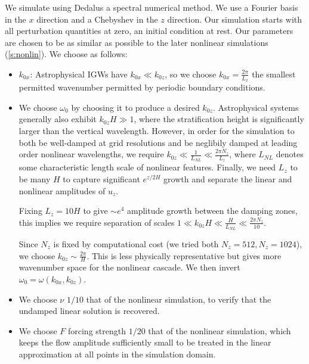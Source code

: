 \documentclass[twocolumn,
        nofootinbib, %
        usenames, %
        aps,
        prd,
        dvipsnames %
    ]{revtex4-1}%
\begin{document}
We simulate using Dedalus\cite{dedalus} a spectral numerical method. We use a
Fourier basis in the $x$ direction and a Chebyshev in the $z$ direction. Our
simulation starts with all perturbation quantities at zero, an initial condition
at rest. Our parameters are chosen to be as similar as possible to the later
nonlinear simulations (\autoref{s:nonlin}). We choose as follows:
\begin{itemize}
    \item $k_{0x}$: Astrophysical IGWs have $k_{0x} \ll k_{0z}$, so we choose $k_{0x}
        = \frac{2\pi}{L_x}$ the smallest permitted wavenumber permitted by
        periodic boundary conditions.

    \item We choose $\omega_0$ by choosing it to produce a desired $k_{0z}$.
        Astrophysical systems generally also exhibit $k_{0z}H \gg 1$, where the
        stratification height is significantly larger than the vertical
        wavelength. However, in order for the simulation to both be well-damped
        at grid resolutions and be neglibily damped at leading order nonlinear
        wavelengths, we require $k_{0z} \ll \frac{1}{L_{NL}} \ll \frac{2\pi
        N_z}{L_z}$, where $L_{NL}$ denotes some characteristic length scale of
        nonlinear features. Finally, we need $L_z$ to be many $H$ to capture
        significant $e^{z/2H}$ growth and separate the linear and nonlinear
        amplitudes of $u_z$.

        Fixing $L_z = 10H$ to give $\sim e^4$ amplitude growth between the
        damping zones, this implies we require separation of scales $1 \ll
        k_{0z}H \ll \frac{H}{L_{NL}} \ll \frac{2\pi N_z}{10}$.

        Since $N_z$ is fixed by computational cost (we tried both $N_z = 512,
        N_z = 1024$), we choose $k_{0z} \sim \frac{2\pi}{H}$. This is less
        physically representative but gives more wavenumber space for the
        nonlinear cascade. We then invert $\omega_0 = \omega(k_{0x}, k_{0z})$.

    \item We choose $\nu$ $1/10$ that of the nonlinear simulation, to verify
        that the undamped linear solution is recovered.

    \item We choose $F$ forcing strength $1/20$ that of the nonlinear
        simulation, which keeps the flow amplitude sufficiently small to be
        treated in the linear approximation at all points in the simulation
        domain.
\end{itemize}
\end{document}
